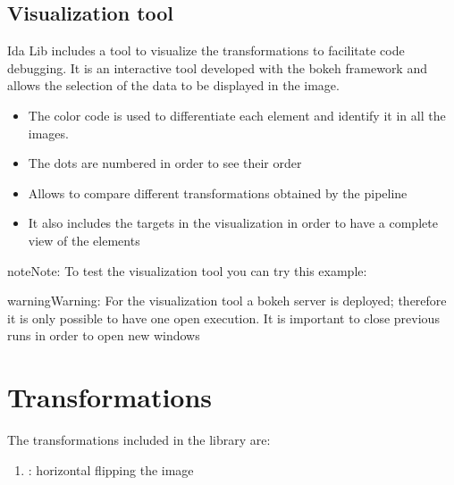 \documentclass[letterpaper,10pt,english]{sphinxmanual}
\begin{document}
\subsection{Visualization tool}
\label{\detokenize{overview:visualization-tool}}
Ida Lib includes a tool to visualize the transformations to facilitate code debugging.
It is an interactive tool developed with the bokeh framework and allows the selection of the data to be displayed in the image.
\begin{itemize}
\item {} 
The color code is used to differentiate each element and identify it in all the images.

\item {} 
The dots are numbered in order to see their order

\item {} 
Allows to compare different transformations obtained by the pipeline

\item {} 
It also includes the targets in the visualization in order to have a complete view of the elements

\end{itemize}


\begin{sphinxadmonition}{note}{Note:}
To test the visualization tool you can try this example:
\end{sphinxadmonition}

\begin{sphinxadmonition}{warning}{Warning:}
For the visualization tool a bokeh server is deployed; therefore it is only possible to have one open execution.
It is important to close previous runs in order to open new windows
\end{sphinxadmonition}


\section{Transformations}
\label{\detokenize{transformations:transformations}}\label{\detokenize{transformations::doc}}
The transformations included in the library are:
\begin{enumerate}
%
\item {} 
: horizontal flipping the image

\end{enumerate}
\end{document}
